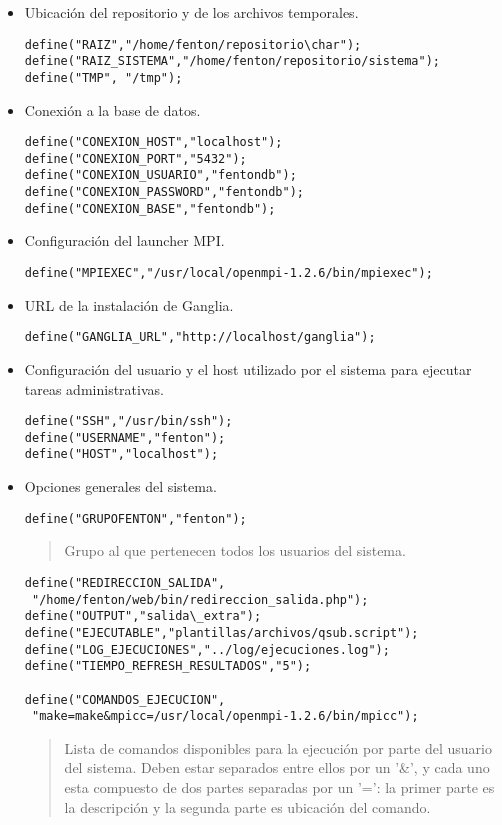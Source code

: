 \documentclass[a4paper,10pt,spanish]{article}
\begin{document}
\begin{itemize}
\item Ubicaci\'{o}n del repositorio y de los archivos temporales.
\begin{verbatim}
define("RAIZ","/home/fenton/repositorio\char");
define("RAIZ_SISTEMA","/home/fenton/repositorio/sistema");
define("TMP", "/tmp");
\end{verbatim}

\item Conexi\'{o}n a la base de datos.
\begin{verbatim}
define("CONEXION_HOST","localhost");
define("CONEXION_PORT","5432");
define("CONEXION_USUARIO","fentondb");
define("CONEXION_PASSWORD","fentondb");
define("CONEXION_BASE","fentondb");
\end{verbatim}

\item Configuraci\'{o}n del launcher MPI.
\begin{verbatim}
define("MPIEXEC","/usr/local/openmpi-1.2.6/bin/mpiexec");
\end{verbatim}

\item URL de la instalaci\'{o}n de Ganglia.
\begin{verbatim}
define("GANGLIA_URL","http://localhost/ganglia");
\end{verbatim}

\item Configuraci\'{o}n del usuario y el host utilizado por el sistema para ejecutar tareas administrativas.
\begin{verbatim}
define("SSH","/usr/bin/ssh"); 
define("USERNAME","fenton"); 
define("HOST","localhost");
\end{verbatim}

\item Opciones generales del sistema.
\begin{verbatim}
define("GRUPOFENTON","fenton");
\end{verbatim} 
\begin{quote}
Grupo al que pertenecen todos los usuarios del sistema.
\end{quote}
\begin{verbatim}
define("REDIRECCION_SALIDA",
 "/home/fenton/web/bin/redireccion_salida.php");
define("OUTPUT","salida\_extra");
define("EJECUTABLE","plantillas/archivos/qsub.script");
define("LOG_EJECUCIONES","../log/ejecuciones.log");
define("TIEMPO_REFRESH_RESULTADOS","5");

define("COMANDOS_EJECUCION",
 "make=make&mpicc=/usr/local/openmpi-1.2.6/bin/mpicc");
\end{verbatim}
\begin{quote}
Lista de comandos disponibles para la ejecuci\'{o}n por parte del usuario del sistema. Deben estar separados entre ellos por un '\&', y cada uno esta compuesto de dos partes separadas por un '=': la primer parte es la descripci\'{o}n y la segunda parte es ubicaci\'{o}n del comando.
\end{quote}


\end{itemize}
\end{document}
